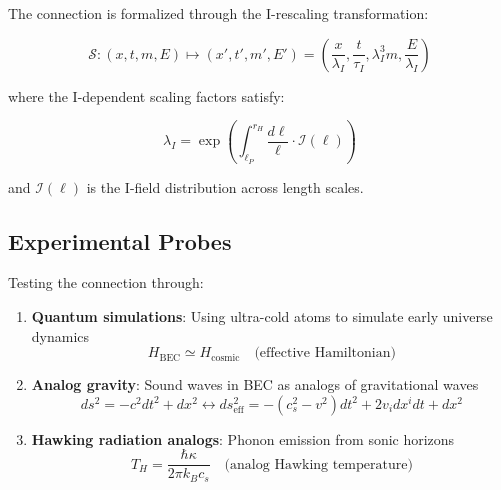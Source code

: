 The connection is formalized through the I-rescaling transformation:

\begin{equation}
\label{eq:i_rescaling}
\mathcal{S}: (x, t, m, E) \mapsto (x', t', m', E') = \left(\frac{x}{\lambda_I}, \frac{t}{\tau_I}, \lambda_I^3 m, \frac{E}{\lambda_I}\right)
\end{equation}

where the I-dependent scaling factors satisfy:

\begin{equation}
\label{eq:scaling_factors}
\lambda_I = \exp\left(\int_{\ell_P}^{r_H} \frac{d\ell}{\ell} \cdot \mathcal{I}(\ell)\right)
\end{equation}

and $\mathcal{I}(\ell)$ is the I-field distribution across length scales.

\subsection{Experimental Probes}

Testing the connection through:

\begin{enumerate}
    \item \textbf{Quantum simulations}: Using ultra-cold atoms to simulate early universe dynamics
    \begin{equation}
    \label{eq:quantum_simulation}
    H_{\text{BEC}} \simeq H_{\text{cosmic}} \quad \text{(effective Hamiltonian)}
    \end{equation}
    
    \item \textbf{Analog gravity}: Sound waves in BEC as analogs of gravitational waves
    \begin{equation}
    \label{eq:analog_gravity}
    ds^2 = -c^2 dt^2 + dx^2 \longleftrightarrow ds_{\text{eff}}^2 = -(c_s^2 - v^2)dt^2 + 2v_i dx^i dt + dx^2
    \end{equation}
    
    \item \textbf{Hawking radiation analogs}: Phonon emission from sonic horizons
    \begin{equation}
    \label{eq:hawking_analog}
    T_H = \frac{\hbar \kappa}{2\pi k_B c_s} \quad \text{(analog Hawking temperature)}
    \end{equation}
\end{enumerate}
